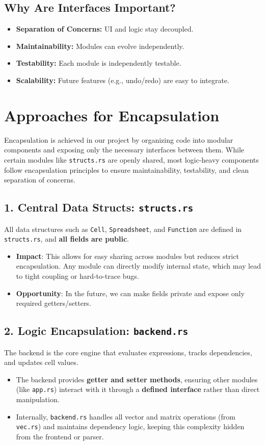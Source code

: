 \documentclass{article}
\begin{document}
\subsection*{Why Are Interfaces Important?}
\begin{itemize}
    \item \textbf{Separation of Concerns:} UI and logic stay decoupled.
    \item \textbf{Maintainability:} Modules can evolve independently.
    \item \textbf{Testability:} Each module is independently testable.
    \item \textbf{Scalability:} Future features (e.g., undo/redo) are easy to integrate.
\end{itemize}

\section*{Approaches for Encapsulation}

Encapsulation is achieved in our project by organizing code into modular components and exposing only the necessary interfaces between them. While certain modules like \texttt{structs.rs} are openly shared, most logic-heavy components follow encapsulation principles to ensure maintainability, testability, and clean separation of concerns.

\subsection*{1. Central Data Structs: \texttt{structs.rs}}
All data structures such as \texttt{Cell}, \texttt{Spreadsheet}, and \texttt{Function} are defined in \texttt{structs.rs}, and \textbf{all fields are public}.
\begin{itemize}
    \item \textbf{Impact}: This allows for easy sharing across modules but reduces strict encapsulation. Any module can directly modify internal state, which may lead to tight coupling or hard-to-trace bugs.
    \item \textbf{Opportunity}: In the future, we can make fields private and expose only required getters/setters.
\end{itemize}

\subsection*{2. Logic Encapsulation: \texttt{backend.rs}}
The backend is the core engine that evaluates expressions, tracks dependencies, and updates cell values.
\begin{itemize}
    \item The backend provides \textbf{getter and setter methods}, ensuring other modules (like \texttt{app.rs}) interact with it through a \textbf{defined interface} rather than direct manipulation.
    \item Internally, \texttt{backend.rs} handles all vector and matrix operations (from \texttt{vec.rs}) and maintains dependency logic, keeping this complexity hidden from the frontend or parser.
\end{itemize}
\end{document}
